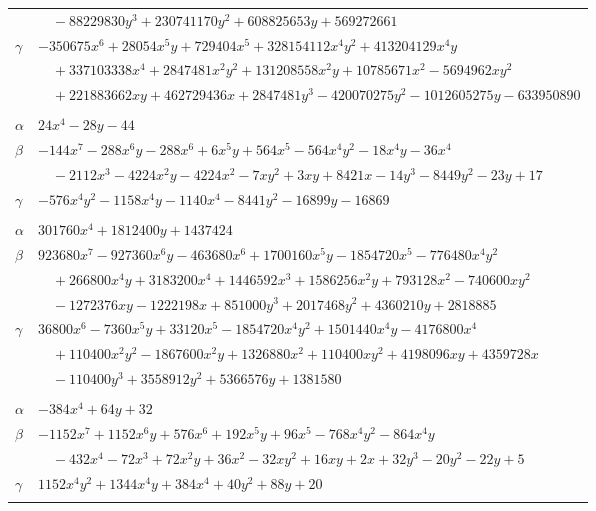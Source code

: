 \documentclass[11pt]{article}
\begin{document}
\begin{longtable}{@{}ll@{}}
 & $\quad -88229830y^{3}+230741170y^{2}+608825653y+569272661$\\
$\gamma$ & $-350675x^{6}+28054x^{5}y+729404x^{5}+328154112x^{4}y^{2}+413204129x^{4}y$\\
 & $\quad +337103338x^{4}+2847481x^{2}y^{2}+131208558x^{2}y+10785671x^{2}-5694962xy^{2}$\\
 & $\quad +221883662xy+462729436x+2847481y^{3}-420070275y^{2}-1012605275y-633950890$\\
\addlinespace[3pt]
\multicolumn{2}{@{}l}{$\{i,j\}=\{17,101\}$, $k_{ij}=2^{2}\cdot 3^{2}\cdot 5\cdot 11\cdot 17$}\\
$\alpha$ & $24x^{4}-28y-44$\\
$\beta$ & $-144x^{7}-288x^{6}y-288x^{6}+6x^{5}y+564x^{5}-564x^{4}y^{2}-18x^{4}y-36x^{4}$\\
 & $\quad -2112x^{3}-4224x^{2}y-4224x^{2}-7xy^{2}+3xy+8421x-14y^{3}-8449y^{2}-23y+17$\\
$\gamma$ & $-576x^{4}y^{2}-1158x^{4}y-1140x^{4}-8441y^{2}-16899y-16869$\\
\addlinespace[3pt]
\multicolumn{2}{@{}l}{$\{i,j\}=\{18,35\}$, $k_{ij}=7\cdot 17$}\\
$\alpha$ & $301760x^{4}+1812400y+1437424$\\
$\beta$ & $923680x^{7}-927360x^{6}y-463680x^{6}+1700160x^{5}y-1854720x^{5}-776480x^{4}y^{2}$\\
 & $\quad +266800x^{4}y+3183200x^{4}+1446592x^{3}+1586256x^{2}y+793128x^{2}-740600xy^{2}$\\
 & $\quad -1272376xy-1222198x+851000y^{3}+2017468y^{2}+4360210y+2818885$\\
$\gamma$ & $36800x^{6}-7360x^{5}y+33120x^{5}-1854720x^{4}y^{2}+1501440x^{4}y-4176800x^{4}$\\
 & $\quad +110400x^{2}y^{2}-1867600x^{2}y+1326880x^{2}+110400xy^{2}+4198096xy+4359728x$\\
 & $\quad -110400y^{3}+3558912y^{2}+5366576y+1381580$\\
\addlinespace[3pt]
\multicolumn{2}{@{}l}{$\{i,j\}=\{18,42\}$, $k_{ij}=7$}\\
$\alpha$ & $-384x^{4}+64y+32$\\
$\beta$ & $-1152x^{7}+1152x^{6}y+576x^{6}+192x^{5}y+96x^{5}-768x^{4}y^{2}-864x^{4}y$\\
 & $\quad -432x^{4}-72x^{3}+72x^{2}y+36x^{2}-32xy^{2}+16xy+2x+32y^{3}-20y^{2}-22y+5$\\
$\gamma$ & $1152x^{4}y^{2}+1344x^{4}y+384x^{4}+40y^{2}+88y+20$\\
\addlinespace[3pt]

\end{longtable}
\end{document}
